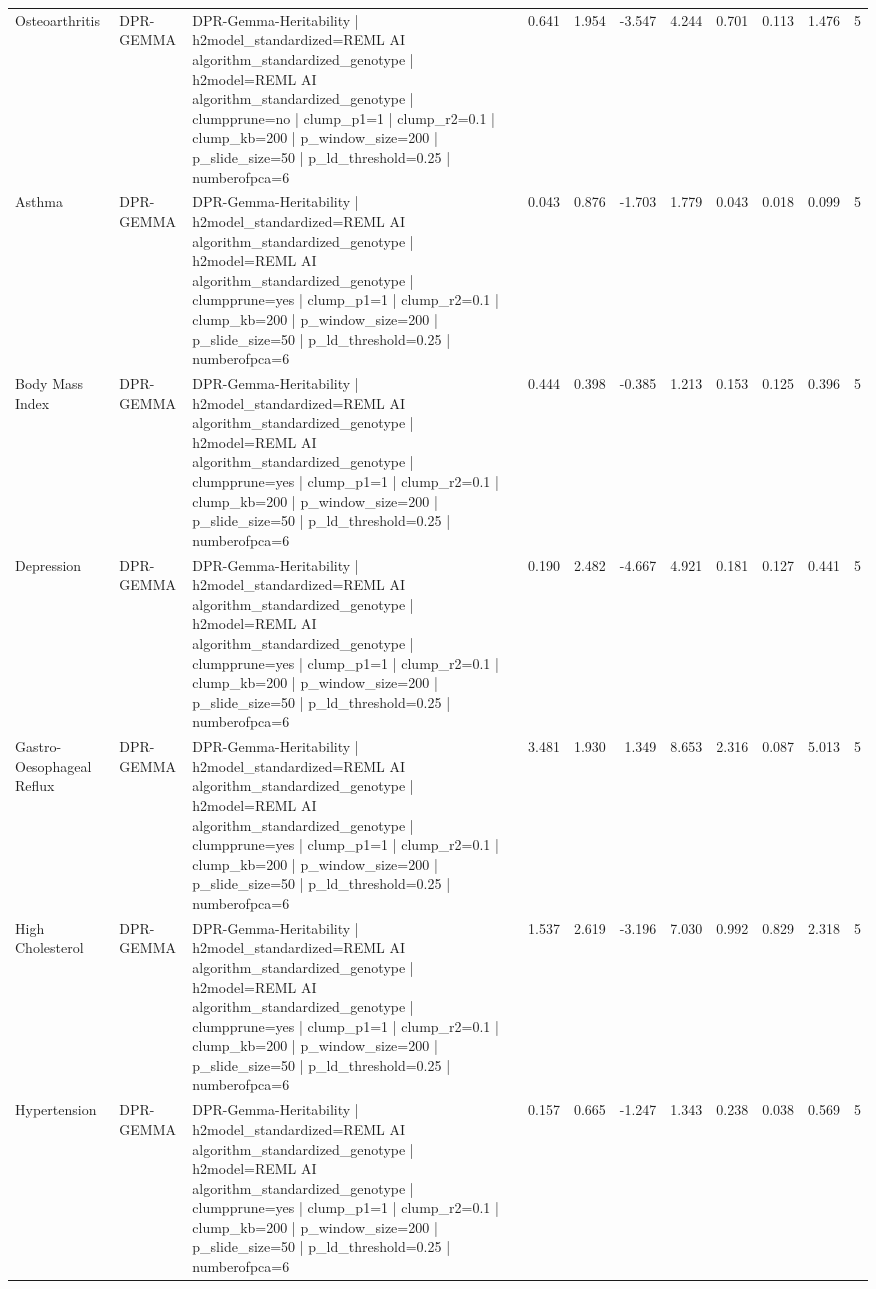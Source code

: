 \begin{landscape}
\begin{longtable}{p{2.4cm}p{1.8cm}p{6.0cm}rrrrrrrr}
Osteoarthritis & DPR-GEMMA & DPR-Gemma-Heritability | h2model\_standardized=REML AI algorithm\_standardized\_genotype | h2model=REML AI algorithm\_standardized\_genotype | clumpprune=no | clump\_p1=1 | clump\_r2=0.1 | clump\_kb=200 | p\_window\_size=200 | p\_slide\_size=50 | p\_ld\_threshold=0.25 | numberofpca=6 & 0.641 & 1.954 & -3.547 & 4.244 & 0.701 & 0.113 & 1.476 & 5 \\
Asthma & DPR-GEMMA & DPR-Gemma-Heritability | h2model\_standardized=REML AI algorithm\_standardized\_genotype | h2model=REML AI algorithm\_standardized\_genotype | clumpprune=yes | clump\_p1=1 | clump\_r2=0.1 | clump\_kb=200 | p\_window\_size=200 | p\_slide\_size=50 | p\_ld\_threshold=0.25 | numberofpca=6 & 0.043 & 0.876 & -1.703 & 1.779 & 0.043 & 0.018 & 0.099 & 5 \\
Body Mass Index & DPR-GEMMA & DPR-Gemma-Heritability | h2model\_standardized=REML AI algorithm\_standardized\_genotype | h2model=REML AI algorithm\_standardized\_genotype | clumpprune=yes | clump\_p1=1 | clump\_r2=0.1 | clump\_kb=200 | p\_window\_size=200 | p\_slide\_size=50 | p\_ld\_threshold=0.25 | numberofpca=6 & 0.444 & 0.398 & -0.385 & 1.213 & 0.153 & 0.125 & 0.396 & 5 \\
Depression & DPR-GEMMA & DPR-Gemma-Heritability | h2model\_standardized=REML AI algorithm\_standardized\_genotype | h2model=REML AI algorithm\_standardized\_genotype | clumpprune=yes | clump\_p1=1 | clump\_r2=0.1 | clump\_kb=200 | p\_window\_size=200 | p\_slide\_size=50 | p\_ld\_threshold=0.25 | numberofpca=6 & 0.190 & 2.482 & -4.667 & 4.921 & 0.181 & 0.127 & 0.441 & 5 \\
Gastro-Oesophageal Reflux & DPR-GEMMA & DPR-Gemma-Heritability | h2model\_standardized=REML AI algorithm\_standardized\_genotype | h2model=REML AI algorithm\_standardized\_genotype | clumpprune=yes | clump\_p1=1 | clump\_r2=0.1 | clump\_kb=200 | p\_window\_size=200 | p\_slide\_size=50 | p\_ld\_threshold=0.25 | numberofpca=6 & 3.481 & 1.930 & 1.349 & 8.653 & 2.316 & 0.087 & 5.013 & 5 \\
High Cholesterol & DPR-GEMMA & DPR-Gemma-Heritability | h2model\_standardized=REML AI algorithm\_standardized\_genotype | h2model=REML AI algorithm\_standardized\_genotype | clumpprune=yes | clump\_p1=1 | clump\_r2=0.1 | clump\_kb=200 | p\_window\_size=200 | p\_slide\_size=50 | p\_ld\_threshold=0.25 | numberofpca=6 & 1.537 & 2.619 & -3.196 & 7.030 & 0.992 & 0.829 & 2.318 & 5 \\
Hypertension & DPR-GEMMA & DPR-Gemma-Heritability | h2model\_standardized=REML AI algorithm\_standardized\_genotype | h2model=REML AI algorithm\_standardized\_genotype | clumpprune=yes | clump\_p1=1 | clump\_r2=0.1 | clump\_kb=200 | p\_window\_size=200 | p\_slide\_size=50 | p\_ld\_threshold=0.25 | numberofpca=6 & 0.157 & 0.665 & -1.247 & 1.343 & 0.238 & 0.038 & 0.569 & 5 \\

\end{longtable}
\end{landscape}
